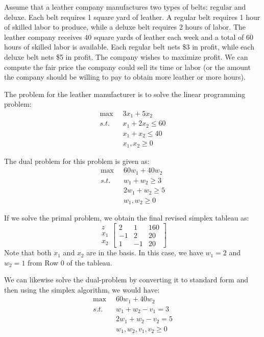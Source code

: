 \begin{example}
Assume that a leather company manufactures two types of belts: regular and deluxe. Each belt requires 1 square yard of leather. A regular belt requires 1 hour of skilled labor to produce, while a deluxe belt requires 2 hours of labor. The leather company receives 40 square yards of leather each week and a total of 60 hours of skilled labor is available. Each regular belt nets \$3 in profit, while each deluxe belt nets \$5 in profit. The company wishes to maximize profit. We can compute the fair price the company could sell its time or labor (or the amount the company should be willing to pay to obtain more leather or more hours).

The problem for the leather manufacturer is to solve the linear programming problem:
\begin{displaymath}
\begin{aligned}
\max\;\; & 3x_1 + 5x_2\\
s.t.\;\; & x_1 + 2x_2 \leq 60\\
& x_1 + x_2 \leq 40\\
& x_1, x_2 \geq 0
\end{aligned}
\end{displaymath}

The dual problem for this problem is given as:
\begin{displaymath}
\begin{aligned}
\max\;\; & 60w_1 + 40w_2\\
s.t.\;\; & w_1 + w_2 \geq 3\\
& 2w_1 + w_2 \geq 5\\
& w_1, w_2 \geq 0
\end{aligned}
\end{displaymath}

If we solve the primal problem, we obtain the final revised simplex tableau as:
\begin{displaymath}
\begin{array}{c}
z\\
x_1\\
x_2
\end{array}
\left[
\begin{array}{cc|c}
2	&	1	&	160\\
\hline
-1	&	2	&	20\\
1	&	-1	&	20
\end{array}
\right]
\end{displaymath}
Note that both $x_1$ and $x_2$ are in the basis. In this case, we have $w_1 = 2$ and $w_2 = 1$ from Row 0 of the tableau.

We can likewise solve the dual-problem by converting it to standard form and then using the simplex algorithm, we would have:
\begin{displaymath}
\begin{aligned}
\max\;\; & 60w_1 + 40w_2\\
s.t.\;\; & w_1 + w_2 -v_1 = 3\\
& 2w_1 + w_2 - v_2 = 5\\
& w_1, w_2,v_1,v_2 \geq 0
\end{aligned}
\end{displaymath}
\end{example}
